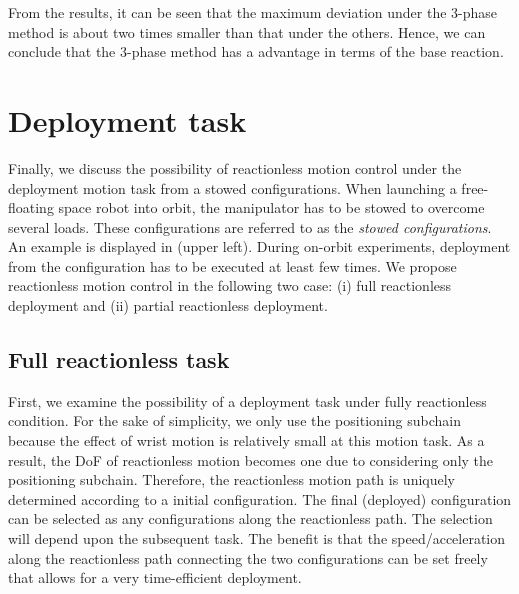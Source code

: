 From the results,
it can be seen that the maximum deviation under the 3-phase method is
about two times smaller than that under the others.
Hence, we can conclude that the 3-phase method has a advantage in terms of the base reaction.



\section{Deployment task}
Finally, we discuss the possibility of reactionless motion control
under the deployment motion task from a stowed configurations.
When launching a free-floating space robot into orbit,
the manipulator has to be stowed to overcome several loads.
These configurations are referred to as the \textit{stowed configurations}.
An example is displayed in  (upper left).
During on-orbit experiments,
deployment from the configuration has to be executed at least few times.
We propose reactionless motion control in the following two case:
(i) full reactionless deployment and
(ii) partial reactionless deployment.

\subsection{Full reactionless task}
First, we examine the possibility of a deployment task under fully reactionless condition.
For the sake of simplicity,
we only use the positioning subchain because the effect of wrist motion is relatively small
at this motion task.
As a result,
the DoF of reactionless motion becomes one due to considering only the positioning subchain.
Therefore,
the reactionless motion path is uniquely determined according to a initial configuration.
The final (deployed) configuration can be selected as any configurations along the reactionless path.
The selection will depend upon the subsequent task.
The benefit is that the speed/acceleration along the reactionless path connecting the two configurations
can be set freely that allows for a very time-efficient deployment.

